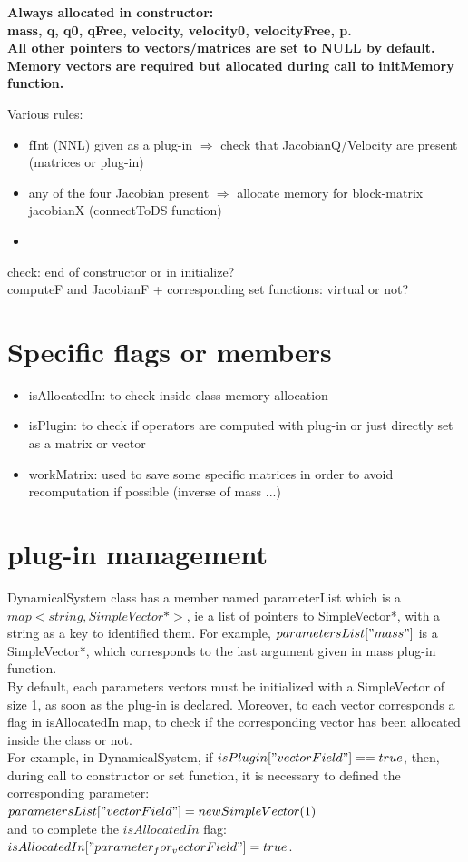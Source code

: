 \documentclass[10pt]{report}
\begin{document}
\bf{Always allocated in constructor:} \\
mass, q, q0, qFree, velocity, velocity0, velocityFree, p. \\
All other pointers to vectors/matrices are set to NULL by default. \\
Memory vectors are required but allocated during call to initMemory function. 

Various rules:
\begin{itemize}
\item fInt (NNL) given as a plug-in $\Rightarrow$ check that JacobianQ/Velocity are present (matrices or plug-in)
\item any of the four Jacobian present $\Rightarrow$ allocate memory for block-matrix jacobianX  (connectToDS function)
\item 
\end{itemize}

check: end of constructor or in initialize? \\
computeF and JacobianF + corresponding set functions: virtual or not? \\


\section{Specific flags or members}

\begin{itemize}
\item isAllocatedIn: to check inside-class memory allocation
\item isPlugin: to check if operators are computed with plug-in or just directly set as a matrix or vector
\item workMatrix: used to save some specific matrices in order to avoid recomputation if possible (inverse of mass ...)
\end{itemize}

\section{plug-in management}
DynamicalSystem class has a member named parameterList which is a $map<string, SimpleVector*>$, ie a list of
pointers to SimpleVector*, with a string as a key to identified them. 
For example, $parametersList["mass"]$ is a SimpleVector*, which corresponds to the last argument given in 
mass plug-in function. \\
By default, each parameters vectors must be initialized with a SimpleVector of size 1, as soon as the plug-in is
declared. Moreover, to each vector corresponds a flag in isAllocatedIn map, to check if the corresponding vector has been 
allocated inside the class or not. \\ 
For example, in DynamicalSystem, if $isPlugin["vectorField"]==true$, then, during call to constructor or set function,
it is necessary to defined the corresponding parameter: \\
$parametersList["vectorField"] = new SimpleVector(1)$ \\
and to complete the $isAllocatedIn$ flag: \\
$isAllocatedIn["parameter_for_vectorField"] = true$. \\
\end{document}
